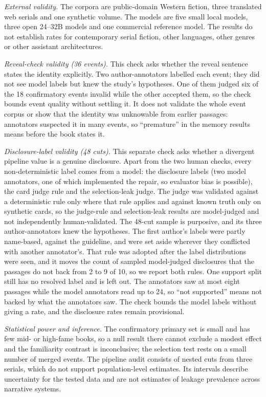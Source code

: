 \documentclass[sn-mathphys]{sn-jnl}%
\theoremstyle{thmstyleone}%
\theoremstyle{thmstyletwo}%
\theoremstyle{thmstylethree}%
\begin{document}
\emph{External validity.} The corpora are public-domain Western fiction, three translated web serials and one synthetic volume. The models are five small local models, three open 24--32B models and one commercial reference model. The results do not establish rates for contemporary serial fiction, other languages, other genres or other assistant architectures.

\emph{Reveal-check validity (36 events).} This check asks whether the reveal sentence states the identity explicitly. Two author-annotators labelled each event; they did not see model labels but knew the study's hypotheses. One of them judged six of the 18 confirmatory events invalid while the other accepted them, so the check bounds event quality without settling it. It does not validate the whole event corpus or show that the identity was unknowable from earlier passages: annotators suspected it in many events, so ``premature'' in the memory results means before the book states it.

\emph{Disclosure-label validity (48 cuts).} This separate check asks whether a divergent pipeline value is a genuine disclosure. Apart from the two human checks, every non-deterministic label comes from a model: the disclosure labels (two model annotators, one of which implemented the repair, so evaluator bias is possible), the card judge rule and the selection-leak judge. The judge was validated against a deterministic rule only where that rule applies and against known truth only on synthetic cards, so the judge-rule and selection-leak results are model-judged and not independently human-validated. The 48-cut sample is purposive, and its three author-annotators knew the hypotheses. The first author's labels were partly name-based, against the guideline, and were set aside wherever they conflicted with another annotator's. That rule was adopted after the label distributions were seen, and it moves the count of sampled model-judged disclosures that the passages do not back from 2 to 9 of 10, so we report both rules. One support split still has no resolved label and is left out. The annotators saw at most eight passages while the model annotators read up to 24, so ``not supported'' means not backed by what the annotators saw. The check bounds the model labels without giving a rate, and the disclosure rates remain provisional.

\emph{Statistical power and inference.} The confirmatory primary set is small and has few mid- or high-fame books, so a null result there cannot exclude a modest effect and the familiarity contrast is inconclusive; the selection test rests on a small number of merged events. The pipeline audit consists of nested cuts from three serials, which do not support population-level estimates. Its intervals describe uncertainty for the tested data and are not estimates of leakage prevalence across narrative systems.
\end{document}

